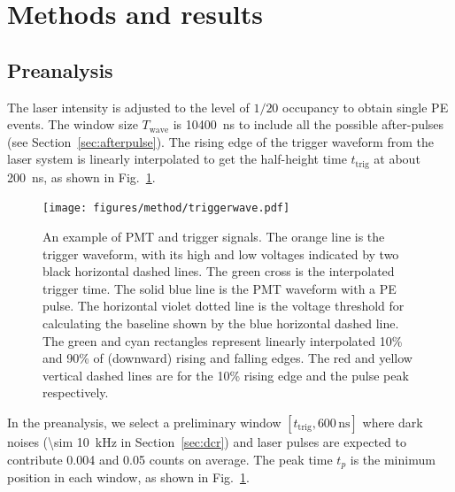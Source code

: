 \section{Methods and results}
\label{Method}
\subsection{Preanalysis}
\label{sec:laserstage}

The laser intensity is adjusted to the level of $1/20$ occupancy to obtain single PE events. The window size $T_{\mathrm{wave}}$ is \SI{10400}{ns} to include all the possible after-pulses (see Section~\ref{sec:afterpulse}). The rising edge of the trigger waveform from the laser system is linearly interpolated to get the half-height time $t_{\mathrm{trig}}$ at about \SI{200}{ns}, as shown in Fig.~\ref{fig:triggertime}.
\begin{figure}[!htbp]
    \centering
    \texttt{[image: figures/method/triggerwave.pdf]}
    \caption{An example of PMT and trigger signals. The orange line is the trigger waveform, with its high and low voltages indicated by two black horizontal dashed lines. The green cross is the interpolated trigger time. The solid blue line is the PMT waveform with a PE pulse. The horizontal violet dotted line is the voltage threshold for calculating the baseline shown by the blue horizontal dashed line. The green and cyan rectangles represent linearly interpolated 10\% and 90\% of (downward) rising and falling edges. The red and yellow vertical dashed lines are for the 10\% rising edge and the pulse peak respectively.}
    \label{fig:triggertime}
\end{figure}


In the preanalysis, we select a preliminary window $[t_{\mathrm{trig}},600\,\mathrm{ns}]$ where dark noises (\SI{\sim 10}{kHz} in Section~\ref{sec:dcr}) and laser pulses are expected to contribute 0.004 and 0.05 counts on average. The peak time $t_p$ is the minimum position in each window, as shown in Fig.~\ref{fig:triggertime}.



